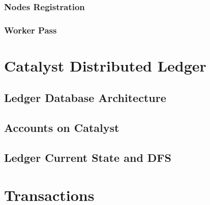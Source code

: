\documentclass[a4paper, 12pt]{book}
\begin{document}
\subsection{Nodes Registration}\label{Sec:Reg}



\subsection{Worker Pass}\label{Sec:PassVal}




\chapter{Catalyst Distributed Ledger} \label{Cha:LDA}


\section{Ledger Database Architecture} \label{Sec:LDA}



\section{Accounts on Catalyst} \label{Sec:AoC}



\section{Ledger Current State and DFS}\label{Sec:DFS}




\chapter{Transactions} \label{Cha:Tra}


\end{document}

